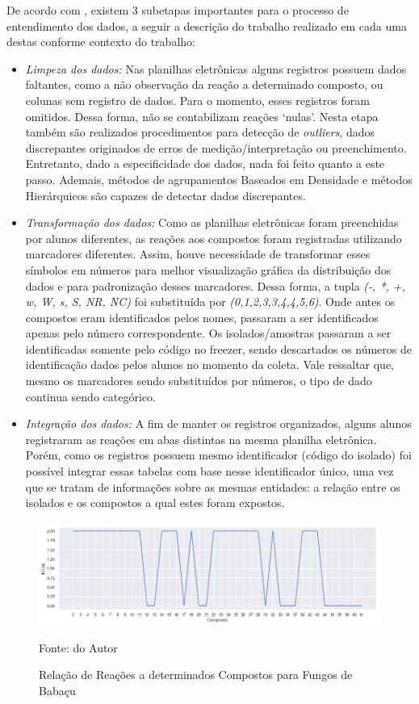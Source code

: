 \documentclass[tcc2]{classe_uftex/uftex}
\begin{document}
     De acordo com \cite{2008:Peay}, existem 3 subetapas importantes para o processo de entendimento dos dados, a seguir a descrição do trabalho realizado em cada uma destas conforme contexto do trabalho:
     \begin{itemize}
         \item \emph{Limpeza dos dados:} Nas planilhas eletrônicas alguns registros possuem dados faltantes, como a não observação da reação a
determinado composto, ou colunas sem registro de dados. Para o momento, esses registros foram omitidos. Dessa forma, não se contabilizam reações ‘nulas’. Nesta etapa também são realizados procedimentos para detecção de \emph{outliers}, dados discrepantes originados de erros de medição/interpretação ou preenchimento. Entretanto, dado a especificidade dos dados, nada foi feito quanto a este passo. Ademais, métodos de agrupamentos Baseados em Densidade e métodos Hierárquicos são capazes de detectar dados discrepantes. %
         \item \emph{Transformação dos dados:} Como as planilhas eletrônicas foram preenchidas por alunos diferentes, as reações aos compostos foram registradas utilizando marcadores diferentes. Assim, houve necessidade de transformar esses símbolos em números para melhor visualização gráfica da distribuição dos dados e para padronização desses marcadores. Dessa forma, a tupla \emph{(-, *, +, w, W, s, S, NR, NC)} foi substituída por \emph{(0,1,2,3,3,4,4,5,6)}. Onde antes os compostos eram identificados pelos nomes, passaram a ser identificados apenas pelo número correspondente. Os isolados/amostras passaram a ser identificadas somente pelo código no freezer, sendo descartados os números de identificação dados pelos alunos no momento da coleta. Vale ressaltar que, mesmo os marcadores sendo substituídos por números, o tipo de dado continua sendo categórico. %
         \item \emph{Integração dos dados:} A fim de manter os registros organizados, alguns alunos registraram as reações em abas distintas na mesma planilha eletrônica. Porém, como os registros possuem mesmo identificador (código do isolado) foi possível integrar essas tabelas com base nesse identificador único, uma vez que se tratam de informações sobre as mesmas entidades: a relação entre os isolados e os compostos a qual estes foram expostos. %
     \end{itemize}
     
         \begin{figure}[hbt]
         \centering
          \includegraphics[scale=0.5]{TCC_Johnny/img/Babacu_Moda-reacaoComposto.png}
          \caption{Relação de Reações a determinados Compostos para Fungos de Babaçu}
          \footnotesize{Fonte: do Autor}
          \label{fig:fig003}
        \end{figure}
        
\end{document}

